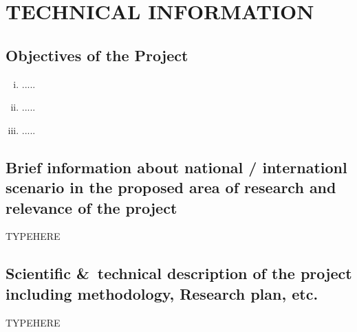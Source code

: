 \chapter{TECHNICAL INFORMATION}

\section{Objectives of the Project}

\begin{enumerate}[i.]
	\item .....
	\item .....
	\item .....
\end{enumerate}

\section{Brief information about national / internationl scenario in the
proposed area of research and relevance of the project}

TYPEHERE

\section{Scientific \&\ technical description of the project including
methodology, Research plan, etc.}

TYPEHERE



